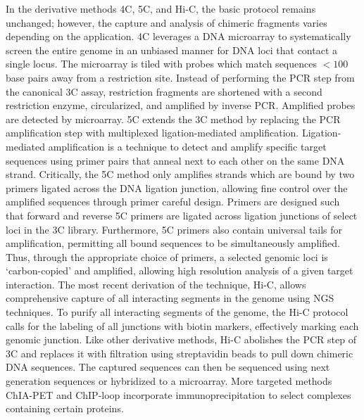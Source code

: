 In the derivative methods 4C, 5C, and Hi-C, the basic protocol remains unchanged; however, the capture and analysis of chimeric fragments varies
depending on the application.  \gls{4C} leverages a DNA microarray to systematically screen the entire genome in an unbiased manner for DNA loci
that contact a single locus\cite{simonis2006}.  The microarray is tiled with probes which match sequences $< 100$ base pairs away from a
restriction site.  Instead of performing the PCR step from the canonical \gls{3C} assay, restriction fragments are shortened with a
second restriction enzyme, circularized, and amplified by inverse PCR\@.  Amplified probes are detected by microarray\cite{simonis2006}.
\gls{5C} extends the \gls{3C} method by replacing the PCR amplification step with multiplexed ligation-mediated amplification.  Ligation-mediated
amplification is a technique to detect and amplify specific target sequences using primer pairs that anneal next to each other on the
same DNA strand\cite{dostie2006}. Critically, the 5C method only amplifies strands which are bound by two primers ligated across the DNA ligation
junction, allowing fine control over the amplified sequences through primer careful design.  Primers are designed such that forward and
reverse \gls{5C} primers are ligated across ligation junctions of select loci in the \gls{3C} library.  Furthermore, \gls{5C} primers also
contain universal tails for amplification, permitting all bound sequences to be simultaneously amplified.  Thus, through the appropriate choice of
primers, a selected genomic loci is `carbon-copied' and amplified, allowing high resolution analysis of a given target interaction\cite{dostie2006}.
The most recent derivation of the technique, Hi-C, allows comprehensive capture of all interacting segments in the genome using \gls{NGS} techniques.
To purify all interacting segments of the genome, the Hi-C protocol calls for the labeling of all junctions with biotin markers, effectively
marking each genomic junction. Like other derivative methods, Hi-C abolishes the PCR step of \gls{3C} and replaces it with filtration using
streptavidin beads to pull down chimeric DNA sequences.  The captured sequences can then be sequenced using next generation sequences or hybridized
to a microarray.  More targeted methods ChIA-PET and ChIP-loop incorporate immunoprecipitation to select complexes containing certain proteins.


